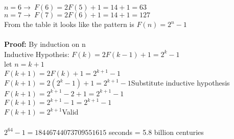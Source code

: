 \documentclass[11pt,letterpaper]{article}
\begin{document}
\begin{enumerate}[(a)]
$n=6\rightarrow~F(6) = 2F(5) + 1 = 14+1=63$\\
$n=7\rightarrow~F(7) = 2F(6) + 1 = 14+1=127$\\
From the table it looks like the pattern is $F(n) = 2^n -1$\\\\
\textbf{Proof:} By induction on n\\ 
Inductive Hypotheis: $F(k) = 2F(k-1) + 1 = 2^k -1$\\
let $n=k+1$\\
$F(k+1) = 2F(k) + 1 = 2^{k+1} -1$\\
$F(k+1) = 2(2^k -1) + 1 = 2^{k+1} -1$\hfill Substitute inductive hypothesis\\
$F(k+1) = 2^{k+1} -2 + 1 = 2^{k+1} -1$\\
$F(k+1) = 2^{k+1} -1 = 2^{k+1} -1$\\
$F(k+1) = 2^{k+1}$\hfill Valid\\
\\
$2^{64}-1=18446744073709551615$ seconds = 5.8 billion centuries
\end{enumerate}
\end{document}
